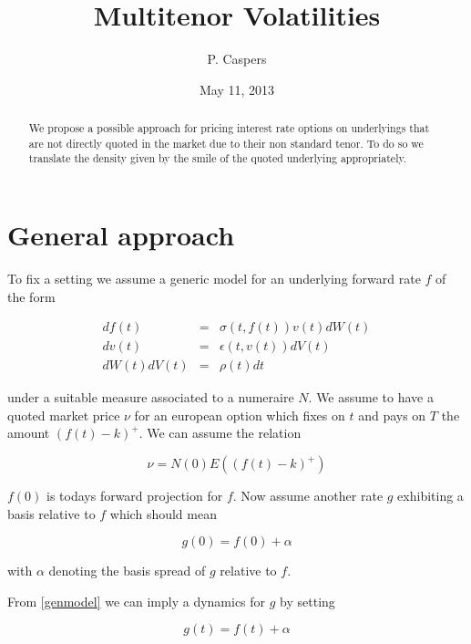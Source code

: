 \documentclass{amsart}
\theoremstyle{plain}
\numberwithin{equation}{section}
\begin{document}
\title[Multitenor Volatilities]{Multitenor Volatilities}
\author{P. Caspers}
\date{May 11, 2013}
\begin{abstract}
We propose  a possible approach for pricing interest rate options on underlyings that are not directly quoted in the market due to their non standard tenor. To do so we translate the density given by the smile of the quoted underlying appropriately. 
\end{abstract}

\maketitle

\section{General approach}
To fix a setting we assume a generic model for an underlying forward rate $f$ of the form

\begin{eqnarray}\label{genmodel}
df(t) &=& \sigma(t,f(t)) v(t) dW(t) \\
dv(t) &=& \epsilon(t,v(t)) dV(t) \\
dW(t) dV(t) &=& \rho(t) dt
\end{eqnarray}

under a suitable measure associated to a numeraire $N$. We assume to have a quoted market price $\nu$ for an european option which fixes on $t$ and pays on $T$ the amount $(f(t)-k)^+$. We can assume the relation

\begin{equation}
\nu = N(0) E( (f(t)-k)^+ )
\end{equation}

$f(0)$ is todays forward projection for $f$. Now assume another rate $g$ exhibiting a basis relative to $f$ which should mean

\begin{equation}
g(0) = f(0) + \alpha
\end{equation}

with $\alpha$ denoting the basis spread of $g$ relative to $f$. 

From \ref{genmodel} we can imply a dynamics for $g$ by setting

\begin{equation}
g(t) = f(t) + \alpha
\end{equation}
\end{document}
